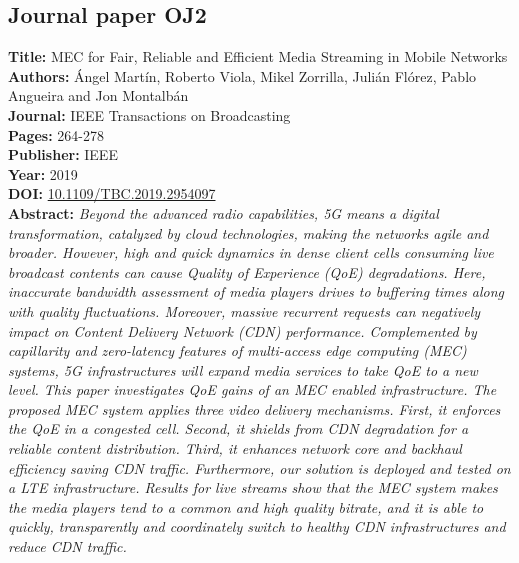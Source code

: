 \subsection{Journal paper OJ2}
\label{chap:TBC2019}
\textbf{Title:} MEC for Fair, Reliable and Efficient Media Streaming in Mobile Networks \\
\textbf{Authors:} \'Angel Mart\'in, Roberto Viola, Mikel Zorrilla, Julián Flórez, Pablo Angueira and Jon Montalbán \\
\textbf{Journal:} IEEE Transactions on Broadcasting \\
\textbf{Pages:} 264-278 \\
\textbf{Publisher:} IEEE \\
\textbf{Year:} 2019 \\
\textbf{DOI:} \url{10.1109/TBC.2019.2954097} \\
\textbf{Abstract:} \textit{Beyond the advanced radio capabilities, 5G means a digital transformation, catalyzed by cloud technologies, making the networks agile and broader. However, high and quick dynamics in dense client cells consuming live broadcast contents can cause Quality of Experience (QoE) degradations. Here, inaccurate bandwidth assessment of media players drives to buffering times along with quality fluctuations. Moreover, massive recurrent requests can negatively impact on Content Delivery Network (CDN) performance. Complemented by capillarity and zero-latency features of multi-access edge computing (MEC) systems, 5G infrastructures will expand media services to take QoE to a new level. This paper investigates QoE gains of an MEC enabled infrastructure. The proposed MEC system applies three video delivery mechanisms. First, it enforces the QoE in a congested cell. Second, it shields from CDN degradation for a reliable content distribution. Third, it enhances network core and backhaul efficiency saving CDN traffic. Furthermore, our solution is deployed and tested on a LTE infrastructure. Results for live streams show that the MEC system makes the media players tend to a common and high quality bitrate, and it is able to quickly, transparently and coordinately switch to healthy CDN infrastructures and reduce CDN traffic.} \\
\hrulefill

